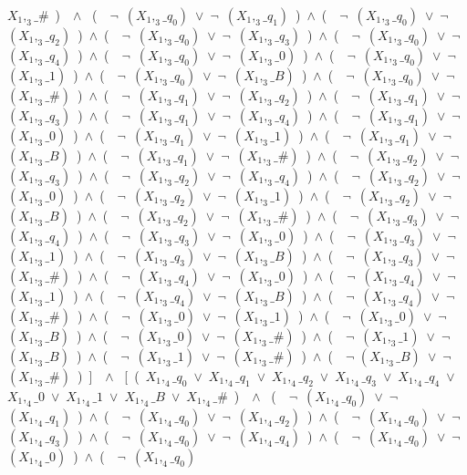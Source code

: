 ﻿\documentclass[a4paper,10pt]{article}
\begin{document}
$X_1,_3\_\#$\ )\ \ $\wedge$ \ (\ \ $\neg$\ $(X_1,_3\_q_0)$\ $\vee$\ $\neg$\ $(X_1,_3\_q_1)$\ )\ $\wedge$\ (\ \ $\neg$\ $(X_1,_3\_q_0)$\ $\vee$\ $\neg$\ $(X_1,_3\_q_2)$\ )\ $\wedge$\ (\ \ $\neg$\ $(X_1,_3\_q_0)$\ $\vee$\ $\neg$\ $(X_1,_3\_q_3)$\ )\ $\wedge$\ (\ \ $\neg$\ $(X_1,_3\_q_0)$\ $\vee$\ $\neg$\ $(X_1,_3\_q_4)$\ )\ $\wedge$\ (\ \ $\neg$\ $(X_1,_3\_q_0)$\ $\vee$\ $\neg$\ $(X_1,_3\_0)$\ )\ $\wedge$\ (\ \ $\neg$\ $(X_1,_3\_q_0)$\ $\vee$\ $\neg$\ $(X_1,_3\_1)$\ )\ $\wedge$\ (\ \ $\neg$\ $(X_1,_3\_q_0)$\ $\vee$\ $\neg$\ $(X_1,_3\_B)$\ )\ $\wedge$\ (\ \ $\neg$\ $(X_1,_3\_q_0)$\ $\vee$\ $\neg$\ $(X_1,_3\_\#)$\ )\ $\wedge$\ (\ \ $\neg$\ $(X_1,_3\_q_1)$\ $\vee$\ $\neg$\ $(X_1,_3\_q_2)$\ )\ $\wedge$\ (\ \ $\neg$\ $(X_1,_3\_q_1)$\ $\vee$\ $\neg$\ $(X_1,_3\_q_3)$\ )\ $\wedge$\ (\ \ $\neg$\ $(X_1,_3\_q_1)$\ $\vee$\ $\neg$\ $(X_1,_3\_q_4)$\ )\ $\wedge$\ (\ \ $\neg$\ $(X_1,_3\_q_1)$\ $\vee$\ $\neg$\ $(X_1,_3\_0)$\ )\ $\wedge$\ (\ \ $\neg$\ $(X_1,_3\_q_1)$\ $\vee$\ $\neg$\ $(X_1,_3\_1)$\ )\ $\wedge$\ (\ \ $\neg$\ $(X_1,_3\_q_1)$\ $\vee$\ $\neg$\ $(X_1,_3\_B)$\ )\ $\wedge$\ (\ \ $\neg$\ $(X_1,_3\_q_1)$\ $\vee$\ $\neg$\ $(X_1,_3\_\#)$\ )\ $\wedge$\ (\ \ $\neg$\ $(X_1,_3\_q_2)$\ $\vee$\ $\neg$\ $(X_1,_3\_q_3)$\ )\ $\wedge$\ (\ \ $\neg$\ $(X_1,_3\_q_2)$\ $\vee$\ $\neg$\ $(X_1,_3\_q_4)$\ )\ $\wedge$\ (\ \ $\neg$\ $(X_1,_3\_q_2)$\ $\vee$\ $\neg$\ $(X_1,_3\_0)$\ )\ $\wedge$\ (\ \ $\neg$\ $(X_1,_3\_q_2)$\ $\vee$\ $\neg$\ $(X_1,_3\_1)$\ )\ $\wedge$\ (\ \ $\neg$\ $(X_1,_3\_q_2)$\ $\vee$\ $\neg$\ $(X_1,_3\_B)$\ )\ $\wedge$\ (\ \ $\neg$\ $(X_1,_3\_q_2)$\ $\vee$\ $\neg$\ $(X_1,_3\_\#)$\ )\ $\wedge$\ (\ \ $\neg$\ $(X_1,_3\_q_3)$\ $\vee$\ $\neg$\ $(X_1,_3\_q_4)$\ )\ $\wedge$\ (\ \ $\neg$\ $(X_1,_3\_q_3)$\ $\vee$\ $\neg$\ $(X_1,_3\_0)$\ )\ $\wedge$\ (\ \ $\neg$\ $(X_1,_3\_q_3)$\ $\vee$\ $\neg$\ $(X_1,_3\_1)$\ )\ $\wedge$\ (\ \ $\neg$\ $(X_1,_3\_q_3)$\ $\vee$\ $\neg$\ $(X_1,_3\_B)$\ )\ $\wedge$\ (\ \ $\neg$\ $(X_1,_3\_q_3)$\ $\vee$\ $\neg$\ $(X_1,_3\_\#)$\ )\ $\wedge$\ (\ \ $\neg$\ $(X_1,_3\_q_4)$\ $\vee$\ $\neg$\ $(X_1,_3\_0)$\ )\ $\wedge$\ (\ \ $\neg$\ $(X_1,_3\_q_4)$\ $\vee$\ $\neg$\ $(X_1,_3\_1)$\ )\ $\wedge$\ (\ \ $\neg$\ $(X_1,_3\_q_4)$\ $\vee$\ $\neg$\ $(X_1,_3\_B)$\ )\ $\wedge$\ (\ \ $\neg$\ $(X_1,_3\_q_4)$\ $\vee$\ $\neg$\ $(X_1,_3\_\#)$\ )\ $\wedge$\ (\ \ $\neg$\ $(X_1,_3\_0)$\ $\vee$\ $\neg$\ $(X_1,_3\_1)$\ )\ $\wedge$\ (\ \ $\neg$\ $(X_1,_3\_0)$\ $\vee$\ $\neg$\ $(X_1,_3\_B)$\ )\ $\wedge$\ (\ \ $\neg$\ $(X_1,_3\_0)$\ $\vee$\ $\neg$\ $(X_1,_3\_\#)$\ )\ $\wedge$\ (\ \ $\neg$\ $(X_1,_3\_1)$\ $\vee$\ $\neg$\ $(X_1,_3\_B)$\ )\ $\wedge$\ (\ \ $\neg$\ $(X_1,_3\_1)$\ $\vee$\ $\neg$\ $(X_1,_3\_\#)$\ )\ $\wedge$\ (\ \ $\neg$ $(X_1,_3\_B)$\ $\vee$\ $\neg$ $(X_1,_3\_\#)$\ )\ ]\ \ $\wedge$ \ [\ (\ $X_1,_4\_q_0$\ $\vee$\ $X_1,_4\_q_1$\ $\vee$\ $X_1,_4\_q_2$\ $\vee$\ $X_1,_4\_q_3$\ $\vee$\ $X_1,_4\_q_4$\ $\vee$\ $X_1,_4\_0$\ $\vee$\ $X_1,_4\_1$\ $\vee$\ $X_1,_4\_B$\ $\vee$\ $X_1,_4\_\#$\ )\ \ $\wedge$ \ (\ \ $\neg$\ $(X_1,_4\_q_0)$\ $\vee$\ $\neg$\ $(X_1,_4\_q_1)$\ )\ $\wedge$\ (\ \ $\neg$\ $(X_1,_4\_q_0)$\ $\vee$\ $\neg$\ $(X_1,_4\_q_2)$\ )\ $\wedge$\ (\ \ $\neg$\ $(X_1,_4\_q_0)$\ $\vee$\ $\neg$\ $(X_1,_4\_q_3)$\ )\ $\wedge$\ (\ \ $\neg$\ $(X_1,_4\_q_0)$\ $\vee$\ $\neg$\ $(X_1,_4\_q_4)$\ )\ $\wedge$\ (\ \ $\neg$\ $(X_1,_4\_q_0)$\ $\vee$\ $\neg$\ $(X_1,_4\_0)$\ )\ $\wedge$\ (\ \ $\neg$\ $(X_1,_4\_q_0)$\ 
\end{document}
